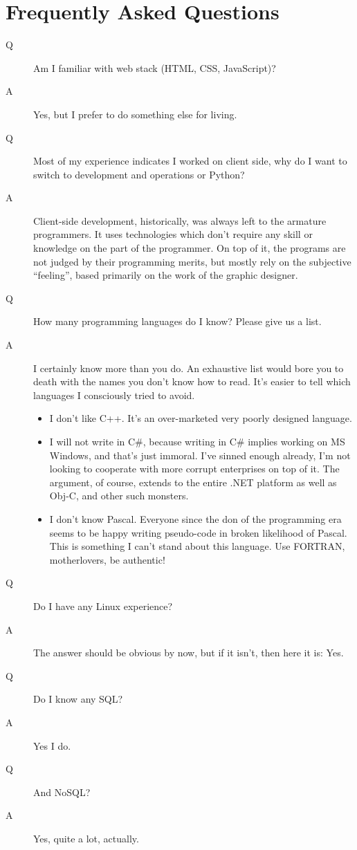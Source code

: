 \documentclass[11pt]{article}
\begin{document}
\section{Frequently Asked Questions}
\label{sec:orgheadline7}
\begin{description}
\item[{Q}] Am I familiar with web stack (HTML, CSS, JavaScript)?
\item[{A}] Yes, but I prefer to do something else for living.

\item[{Q}] Most of my experience indicates I worked on client side, why do I want
to switch to development and operations or Python?
\item[{A}] Client-side development, historically, was always left to the armature
programmers.  It uses technologies which don't require any skill or
knowledge on the part of the programmer.  On top of it, the programs are
not judged by their programming merits, but mostly rely on the subjective
``feeling'', based primarily on the work of the graphic designer.

\item[{Q}] How many programming languages do I know? Please give us a list.
\item[{A}] I certainly know more than you do.  An exhaustive list would bore you
to death with the names you don't know how to read.  It's easier to
tell which languages I consciously tried to avoid.
\begin{itemize}
\item I don't like C++.  It's an over-marketed very poorly designed language.
\item I will not write in C\#, because writing in C\# implies working on MS Windows,
and that's just immoral.  I've sinned enough already, I'm not looking to
cooperate with more corrupt enterprises on top of it.  The argument,
of course, extends to the entire .NET platform as well as Obj-C, and other
such monsters.
\item I don't know Pascal.  Everyone since the don of the programming era seems
to be happy writing pseudo-code in broken likelihood of Pascal.  This is
something I can't stand about this language.  Use FORTRAN, motherlovers,
be authentic!
\end{itemize}

\item[{Q}] Do I have any Linux experience?
\item[{A}] The answer should be obvious by now, but if it isn't, then here it is:
Yes.

\item[{Q}] Do I know any SQL?
\item[{A}] Yes I do.

\item[{Q}] And NoSQL?
\item[{A}] Yes, quite a lot, actually.
\end{description}
\end{document}
